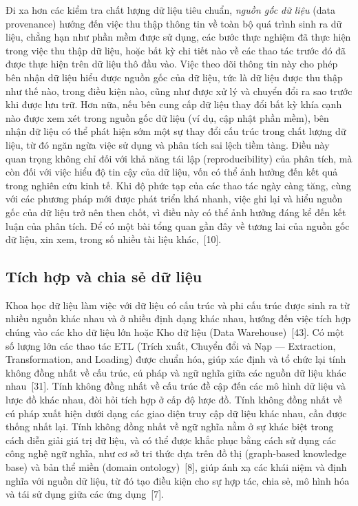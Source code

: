 Đi xa hơn các kiểm tra chất lượng dữ liệu tiêu chuẩn, \emph{nguồn gốc dữ liệu} (data provenance) hướng đến việc thu thập thông tin về toàn bộ quá trình sinh ra dữ liệu, chẳng hạn như phần mềm được sử dụng, các bước thực nghiệm đã thực hiện trong việc thu thập dữ liệu, hoặc bất kỳ chi tiết nào về các thao tác trước đó đã được thực hiện trên dữ liệu thô đầu vào. Việc theo dõi thông tin này cho phép bên nhận dữ liệu hiểu được nguồn gốc của dữ liệu, tức là dữ liệu được thu thập như thế nào, trong điều kiện nào, cũng như được xử lý và chuyển đổi ra sao trước khi được lưu trữ. Hơn nữa, nếu bên cung cấp dữ liệu thay đổi bất kỳ khía cạnh nào được xem xét trong nguồn gốc dữ liệu (ví dụ, cập nhật phần mềm), bên nhận dữ liệu có thể phát hiện sớm một sự thay đổi cấu trúc trong chất lượng dữ liệu, từ đó ngăn ngừa việc sử dụng và phân tích sai lệch tiềm tàng. Điều này quan trọng không chỉ đối với khả năng tái lập (reproducibility) của phân tích, mà còn đối với việc hiểu độ tin cậy của dữ liệu, vốn có thể ảnh hưởng đến kết quả trong nghiên cứu kinh tế. Khi độ phức tạp của các thao tác ngày càng tăng, cùng với các phương pháp mới được phát triển khá nhanh, việc ghi lại và hiểu nguồn gốc của dữ liệu trở nên then chốt, vì điều này có thể ảnh hưởng đáng kể đến kết luận của phân tích. Để có một bài tổng quan gần đây về tương lai của nguồn gốc dữ liệu, xin xem, trong số nhiều tài liệu khác,~[10].

\subsection{Tích hợp và chia sẻ dữ liệu}

Khoa học dữ liệu làm việc với dữ liệu có cấu trúc và phi cấu trúc được sinh ra từ nhiều nguồn khác nhau và ở nhiều định dạng khác nhau, hướng đến việc tích hợp chúng vào các kho dữ liệu lớn hoặc Kho dữ liệu (Data Warehouse)~[43]. Có một số lượng lớn các thao tác ETL (Trích xuất, Chuyển đổi và Nạp — Extraction, Transformation, and Loading) được chuẩn hóa, giúp xác định và tổ chức lại tính không đồng nhất về cấu trúc, cú pháp và ngữ nghĩa giữa các nguồn dữ liệu khác nhau~[31]. Tính không đồng nhất về cấu trúc đề cập đến các mô hình dữ liệu và lược đồ khác nhau, đòi hỏi tích hợp ở cấp độ lược đồ. Tính không đồng nhất về cú pháp xuất hiện dưới dạng các giao diện truy cập dữ liệu khác nhau, cần được thống nhất lại. Tính không đồng nhất về ngữ nghĩa nằm ở sự khác biệt trong cách diễn giải giá trị dữ liệu, và có thể được khắc phục bằng cách sử dụng các công nghệ ngữ nghĩa, như cơ sở tri thức dựa trên đồ thị (graph-based knowledge base) và bản thể miền (domain ontology)~[8], giúp ánh xạ các khái niệm và định nghĩa với nguồn dữ liệu, từ đó tạo điều kiện cho sự hợp tác, chia sẻ, mô hình hóa và tái sử dụng giữa các ứng dụng~[7].

